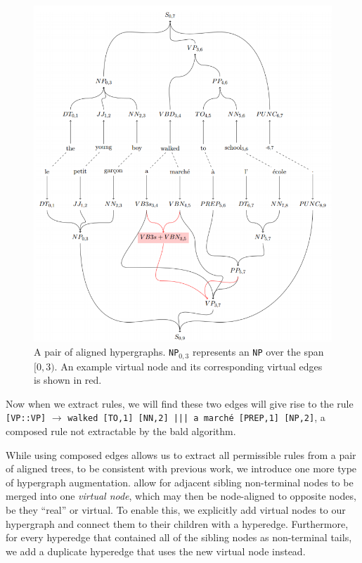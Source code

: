 \documentclass[nofonts]{pbml} %
\begin{document}
\begin{figure}
\centering
\includegraphics[scale=0.33]{virtualnode.png}
\caption{A pair of aligned hypergraphs. \texttt{NP}$_{0,3}$ represents an \texttt{NP} over the span $[0,3)$.
An example virtual node and its corresponding virtual edges is shown in red.}
\label{virtualnodefig}
\end{figure}

Now when we extract rules, we will find these two edges will give rise to the rule
\texttt{[VP::VP]} $\rightarrow$ \texttt{walked [TO,1] [NN,2] ||| a march\'{e} [PREP,1] [NP,2]}, a composed rule not extractable
by the bald algorithm.

While using composed edges allows us to extract all permissible rules from a pair of aligned trees, to be consistent with previous work,
we introduce one more type of hypergraph augmentation.
\citet{hanneman2011general} allow for adjacent sibling non-terminal nodes to be merged into one \emph{virtual node}, which may then be node-aligned to opposite nodes,
be they ``real'' or virtual. To enable this, we explicitly add virtual nodes to our hypergraph and connect them to their children with a hyperedge.
Furthermore, for every hyperedge that contained all of the sibling nodes
as non-terminal tails, we add a duplicate hyperedge that uses the new virtual node instead.
\end{document}
